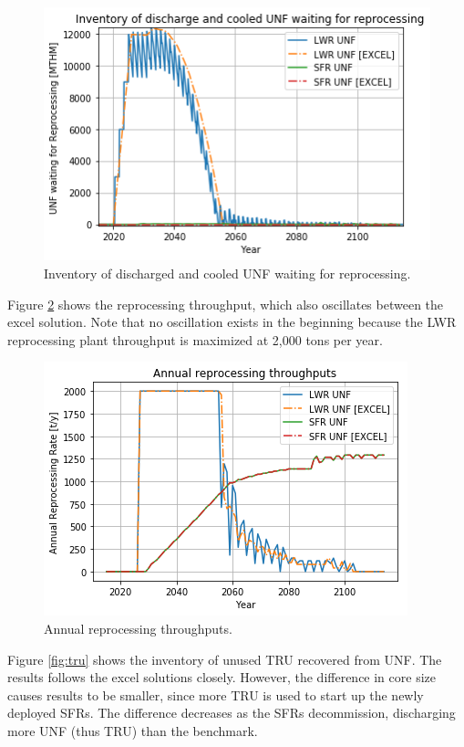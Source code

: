 \begin{figure}[htbp!]
    \begin{center}
        \includegraphics[scale=0.5]{./images/results_18/waiting_monthly.png}
    \end{center}
        \caption{Inventory of discharged and cooled \gls{UNF} waiting for reprocessing.}
    \label{fig:waiting_monthly}
\end{figure}


Figure \ref{fig:rep} shows the reprocessing throughput, which also oscillates between
the excel solution. Note that no oscillation exists in the beginning because the
\gls{LWR} reprocessing plant throughput is maximized at 2,000 tons per year.

\begin{figure}[htbp!]
    \begin{center}
        \includegraphics[scale=0.5]{./images/results_18/rep.png}
    \end{center}
        \caption{Annual reprocessing throughputs.}
    \label{fig:rep}
\end{figure}


Figure \ref{fig:tru} shows the inventory of unused \gls{TRU} recovered from \gls{UNF}.
The \Cyclus results follows the excel solutions closely. However, the difference
in core size causes \Cyclus results to be smaller, since more \gls{TRU} is used to
start up the newly deployed \glspl{SFR}. The difference decreases as the
\glspl{SFR} decommission, discharging more \gls{UNF} (thus \gls{TRU}) than
the benchmark.

